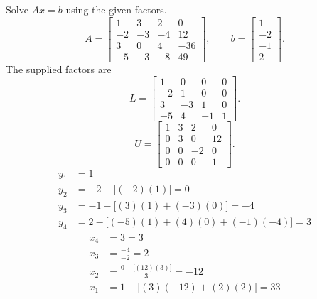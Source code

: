 \goal Solve $Ax=b$ using the given factors.
\[A=\left[\begin{matrix}1 & 3 & 2 & 0\\-2 & -3 & -4 & 12\\3 & 0 & 4 & -36\\-5 & -3 & -8 & 49\end{matrix}\right],\qquad b=\left[\begin{matrix}1\\-2\\-1\\2\end{matrix}\right].\]
The supplied factors are
\[L=\left[\begin{matrix}1 & 0 & 0 & 0\\-2 & 1 & 0 & 0\\3 & -3 & 1 & 0\\-5 & 4 & -1 & 1\end{matrix}\right].\]
\[U=\left[\begin{matrix}1 & 3 & 2 & 0\\0 & 3 & 0 & 12\\0 & 0 & -2 & 0\\0 & 0 & 0 & 1\end{matrix}\right].\]
\begin{align*}y_{1}&=1\\
y_{2}&=-2-\bigl[(-2)(1)\bigr]=0\\
y_{3}&=-1-\bigl[(3)(1)+(-3)(0)\bigr]=-4\\
y_{4}&=2-\bigl[(-5)(1)+(4)(0)+(-1)(-4)\bigr]=3\end{align*}
\begin{align*}x_{4}&=3=3\\
x_{3}&=\frac{-4}{-2}=2\\
x_{2}&=\frac{0-\bigl[(12)(3)\bigr]}{3}=-12\\
x_{1}&=1-\bigl[(3)(-12)+(2)(2)\bigr]=33\end{align*}

